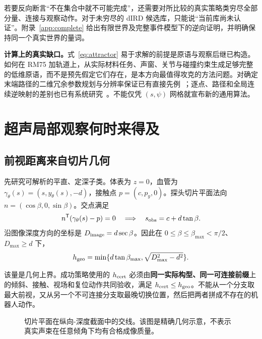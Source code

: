 \documentclass[11pt,a4paper]{article}
\theoremstyle{cn}
\begin{document}
若要反向断言“不在集合中就不可能完成”，还需要对所比较的真实策略类穷尽全部分量、连接与观察动作。对于未穷尽的 dIRD 候选库，只能说“当前库尚未认证”。附录~\ref{app:complete} 给出有限世界及完整事件模型下的逆向证明，并明确保持同一个真实世界的量词。

\textbf{计算上的真实缺口。}式~\eqref{eq:attractor} 易于求解的前提是原语与观察后继已构造。如何在 RM75 加轨道上，从实际材料任务、声窗、关节与碰撞约束生成足够完整的低维原语，而不是预先假定它们存在，是本方向最值得攻克的方法问题。对确定末端路径的二维冗余参数规划与分辨率保证已有直接先例~\cite{qiu}；逐点、路径和全局连续逆映射的差别也已有系统研究~\cite{hauser}。不能仅凭 \((s,\psi)\) 网格就宣布新的通用算法。

\section{超声局部观察何时来得及}
\label{sec:geometry}

\subsection{前视距离来自切片几何}

先研究可解析的平直、定深子类。体表为 \(z=0\)，血管为
\(\gamma_\theta(s)=(s,y_\theta(s),-d)\)，接触点
\(p=(c,p_y,0)\)。探头切片平面法向
\(n=(\cos\beta,0,\sin\beta)\)。交点满足
\begin{equation}
n^{\mathsf T}(\gamma_\theta(s)-p)=0
\quad\Longrightarrow\quad
s_{\rm obs}=c+d\tan\beta.
\label{eq:slice}
\end{equation}
沿图像深度方向的坐标是 \(D_{\rm image}=d\sec\beta\)。因此在
\(0\le\beta\le\beta_{\max}<\pi/2\)、\(D_{\max}\ge d\) 下，
\begin{equation}
h_{\rm geo}=\min\{d\tan\beta_{\max},\sqrt{D_{\max}^2-d^2}\}.
\label{eq:horizon}
\end{equation}

该量是几何上界。成功策略使用的 \(h_{\rm cert}\) 必须由\textbf{同一实际构型、同一可连接前缀}上的倾斜、接触、视场和复位动作共同验收，满足 \(h_{\rm cert}\le h_{\rm geo}\)。不能从一个分支取最大前视，又从另一个不可连接分支取最晚切换位置，然后把两者拼成不存在的机器人动作。

\begin{figure}[htbp]
\centering
{}
\caption{切片平面在纵向-深度截面中的交线。该图是精确几何示意，不表示真实声束在任意倾角下均有合格成像质量。}
\end{figure}
\end{document}
